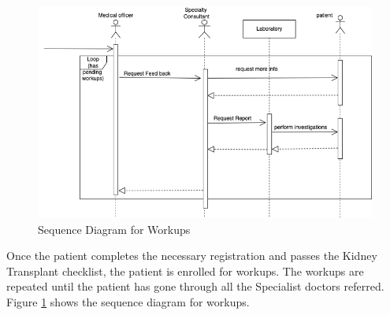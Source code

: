 \documentclass[12pt,a4paper]{report}
\begin{document}
 \begin{figure}[hbp]
\begin{center}
\includegraphics[width=\textwidth]{images/workups.png}	
\end{center}
\caption{Sequence Diagram for Workups}
\label{fig:patient-workups}
\end{figure}
Once the patient completes the necessary registration and passes the Kidney Transplant checklist, the patient is enrolled for workups. The workups are repeated until the patient has gone through all the Specialist doctors referred. Figure \ref{fig:patient-workups} shows the sequence diagram for workups.



\newpage
 
\end{document}
